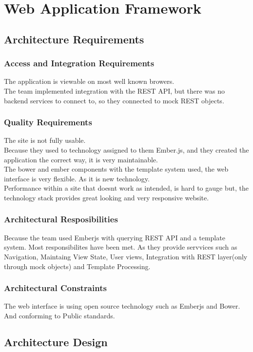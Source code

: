 \documentclass[a4paper,10pt]{article}
\begin{document}
\section{Web Application Framework}
  \subsection{Architecture Requirements}
    \subsubsection{Access and Integration Requirements}
      The application is viewable on most well known browers.\\
      The team implemented integration with the REST API, but there was no backend services to connect to, so they connected to mock REST objects.
    \subsubsection{Quality Requirements}
      The site is not fully usable.\\
      Because they used to technology assigned to them Ember.js, and they created the application the correct way, it is very maintainable.\\
      The bower and ember components with the template system used, the web interface is very flexible. As it is new technology.\\
      Performance within a site that doesnt work as intended, is hard to gauge but, the technology stack provides great looking and very responsive website.
    \subsubsection{Architectural Resposibilities}
      Because the team used Emberjs with querying REST API and a template system. Most responsibilites have been met. As they provide servvices such as Navigation, Maintaing View State, User views, Integration with REST layer(only through mock objects) and Template Processing.
    \subsubsection{Architectural Constraints}
      The web interface is using open source technology such as Emberjs and Bower. And conforming to Public standards.
  \subsection{Architecture Design}
\end{document}
